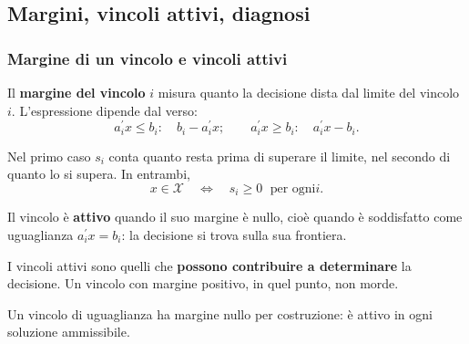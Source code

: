 

\subsection{Margini, vincoli attivi, diagnosi}%

\begin{frame}%
%

\frametitle{Margine di un vincolo e vincoli attivi}%
%

%


Il \textbf{margine del vincolo} $i$ misura quanto la decisione dista dal
limite del vincolo $i$. L'espressione dipende dal verso:
\[
a_{i}^{\prime}x\leq b_{i}: \quad b_{i}-a_{i}^{\prime}x; \qquad a_{i}^{\prime
}x\geq b_{i}: \quad a_{i}^{\prime}x-b_{i}.
\]


Nel primo caso $s_{i}$ conta quanto resta prima di superare il limite, nel
secondo di quanto lo si supera. In entrambi,
\[
x\in\mathcal{X} \quad\Longleftrightarrow\quad s_{i}\geq0 \;\text{ per ogni
}i.
\]


Il vincolo \`{e} \textbf{attivo} quando il suo margine \`{e} nullo, cio\`{e}
quando \`{e} soddisfatto come uguaglianza $a_{i}^{\prime}x=b_{i}$: la
decisione si trova sulla sua frontiera.

\medskip

\begin{stepitemize}


\item I vincoli attivi sono quelli che \textbf{possono contribuire a
determinare} la decisione. Un vincolo con margine positivo, in quel punto, non morde.

\item Un vincolo di uguaglianza ha margine nullo per costruzione: \`{e} attivo
in ogni soluzione ammissibile.
\end{stepitemize}

%

\transboxout
\end{frame}%


